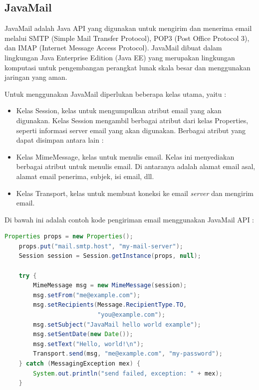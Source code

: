 \subsection{JavaMail}
\label{javamail}
JavaMail adalah Java API yang digunakan untuk mengirim dan menerima email melalui SMTP (Simple Mail Transfer Protocol), POP3 (Post Office Protocol 3), dan IMAP (Internet Message Access Protocol)\cite{javamail}. JavaMail dibuat dalam lingkungan Java Enterprise Edition (Java EE) yang merupakan lingkungan komputasi untuk pengembangan perangkat lunak skala besar dan menggunakan jaringan yang aman.


Untuk menggunakan JavaMail diperlukan beberapa kelas utama, yaitu :
\begin{itemize}
	\item Kelas Session, kelas untuk mengumpulkan atribut email yang akan digunakan. Kelas Session mengambil berbagai atribut dari kelas Properties, seperti informasi server email yang akan digunakan. Berbagai atribut yang dapat disimpan antara lain :
	\item Kelas MimeMessage, kelas untuk menulis email. Kelas ini menyediakan berbagai atribut untuk menulis email. Di antaranya adalah alamat email asal, alamat email penerima, subjek, isi email, dll.
	\item Kelas Transport, kelas untuk membuat koneksi ke email \textit{server} dan mengirim email.
\end{itemize}
Di bawah ini adalah contoh kode pengiriman email menggunakan JavaMail API : 

\begin{lstlisting}[language=Java,basicstyle=\tiny,caption=Contoh Kode Pengiriman Email]
Properties props = new Properties();
    props.put("mail.smtp.host", "my-mail-server");
    Session session = Session.getInstance(props, null);

    try {
        MimeMessage msg = new MimeMessage(session);
        msg.setFrom("me@example.com");
        msg.setRecipients(Message.RecipientType.TO,
                          "you@example.com");
        msg.setSubject("JavaMail hello world example");
        msg.setSentDate(new Date());
        msg.setText("Hello, world!\n");
        Transport.send(msg, "me@example.com", "my-password");
    } catch (MessagingException mex) {
        System.out.println("send failed, exception: " + mex);
    }
		
\end{lstlisting}


